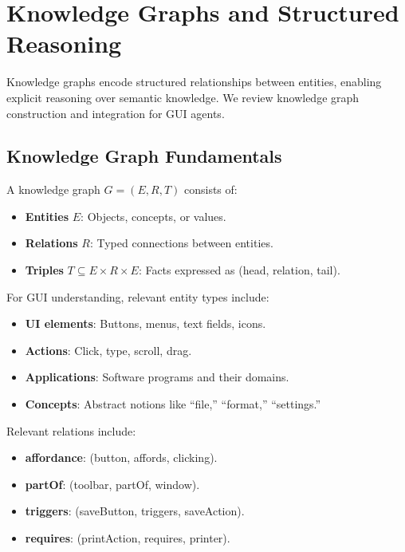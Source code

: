 \documentclass[11pt]{article}
\begin{document}
\section{Knowledge Graphs and Structured Reasoning}
\label{sec:kg}

Knowledge graphs encode structured relationships between entities, enabling explicit reasoning over semantic knowledge. We review knowledge graph construction and integration for GUI agents.

\subsection{Knowledge Graph Fundamentals}

A knowledge graph $G = (E, R, T)$ consists of:

\begin{itemize}
    \item \textbf{Entities} $E$: Objects, concepts, or values.
    \item \textbf{Relations} $R$: Typed connections between entities.
    \item \textbf{Triples} $T \subseteq E \times R \times E$: Facts expressed as (head, relation, tail).
\end{itemize}

For GUI understanding, relevant entity types include:

\begin{itemize}
    \item \textbf{UI elements}: Buttons, menus, text fields, icons.
    \item \textbf{Actions}: Click, type, scroll, drag.
    \item \textbf{Applications}: Software programs and their domains.
    \item \textbf{Concepts}: Abstract notions like ``file,'' ``format,'' ``settings.''
\end{itemize}

Relevant relations include:

\begin{itemize}
    \item \textbf{affordance}: (button, affords, clicking).
    \item \textbf{partOf}: (toolbar, partOf, window).
    \item \textbf{triggers}: (saveButton, triggers, saveAction).
    \item \textbf{requires}: (printAction, requires, printer).
\end{itemize}
\end{document}

